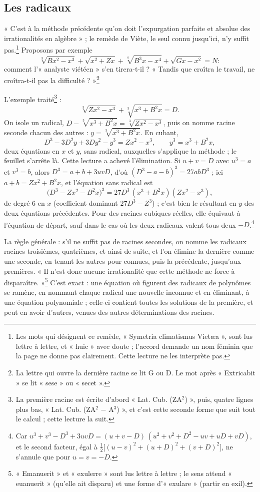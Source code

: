 \documentclass[11pt,a4paper]{article}
\begin{document}
\subsection*{Les radicaux}

« C'est à la méthode précédente qu'on doit l'expurgation parfaite et absolue
des irrationalités en algèbre » ; le remède de Viète, le seul connu jusqu'ici,
n'y suffit pas.\footnote{Les mots qui désignent ce remède, « Symetria
climatismus Vietæa », sont lus lettre à lettre, et « huic » avec doute ;
l'accord demande un nom féminin que la page ne donne pas clairement. Cette
lecture ne les interprète pas.} Proposons par exemple
\[ \sqrt[3]{Bx^2 - x^3} + \sqrt{x^2 + Zx} + \sqrt[4]{B^3x - x^4}
   + \sqrt{Gx - x^2} = N : \]
comment l'« analyste viétéen » s'en tirera-t-il ? « Tandis que croîtra le
travail, ne croîtra-t-il pas la difficulté ? »\footnote{La lettre qui ouvre la
dernière racine se lit G ou D. Le mot après « Extricabit » se lit « sese » ou
« secet ».}

L'exemple traité\footnote{La première racine est écrite d'abord « Lat. Cub.
(ZA$^2$) », puis, quatre lignes plus bas, « Lat. Cub. (ZA$^2$ $-$ A$^3$) », et
c'est cette seconde forme que suit tout le calcul ; cette lecture la suit.} :
\[ \sqrt[3]{Zx^2 - x^3} + \sqrt[3]{x^3 + B^2x} = D . \]
On isole un radical, $D - \sqrt[3]{x^3 + B^2x}
= \sqrt[3]{Zx^2 - x^3}$, puis on nomme racine seconde chacun des autres :
$y = \sqrt[3]{x^3 + B^2x}$. En cubant,
\[ D^3 - 3D^2y + 3Dy^2 - y^3 = Zx^2 - x^3, \qquad y^3 = x^3 + B^2x , \]
deux équations en $x$ et $y$, sans radical, auxquelles s'applique la méthode ;
le feuillet s'arrête là. Cette lecture a achevé l'élimination. Si $u + v = D$
avec $u^3 = a$ et $v^3 = b$, alors $D^3 = a + b + 3uvD$, d'où
$(D^3 - a - b)^3 = 27abD^3$ ; ici $a + b = Zx^2 + B^2x$, et l'équation sans
radical est
\[ \bigl(D^3 - Zx^2 - B^2x\bigr)^3 = 27D^3\,(x^3 + B^2x)(Zx^2 - x^3) , \]
de degré 6 en $x$ (coefficient dominant $27D^3 - Z^3$) ; c'est bien le
résultant en $y$ des deux équations précédentes. Pour des racines cubiques
réelles, elle équivaut à l'équation de départ, sauf dans le cas où les deux
radicaux valent tous deux $-D$.\footnote{Car
$u^3 + v^3 - D^3 + 3uvD = (u + v - D)\,(u^2 + v^2 + D^2 - uv + uD + vD)$, et le
second facteur, égal à $\tfrac12\bigl[(u-v)^2 + (u+D)^2 + (v+D)^2\bigr]$, ne
s'annule que pour $u = v = -D$.}

La règle générale : s'il ne suffit pas de racines secondes, on nomme les
radicaux racines troisièmes, quatrièmes, et ainsi de suite, et l'on élimine la
dernière comme une seconde, en tenant les autres pour connues, puis la
précédente, jusqu'aux premières. « Il n'est donc aucune irrationalité que cette
méthode ne force à disparaître. »\footnote{« Emanuerit » et « exulerre » sont
lus lettre à lettre ; le sens attend « euanuerit » (qu'elle ait disparu) et
une forme d'« exulare » (partir en exil).} C'est exact : une équation où
figurent des radicaux de polynômes se ramène, en nommant chaque radical une
nouvelle inconnue et en éliminant, à une équation polynomiale ; celle-ci
contient toutes les solutions de la première, et peut en avoir d'autres,
venues des autres déterminations des racines.
\end{document}
